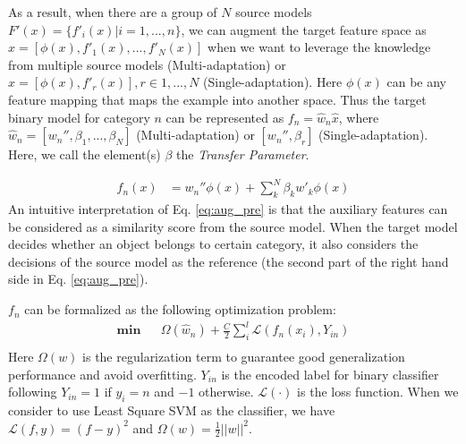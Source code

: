 As a result, when there are a group of $N$ source models $F'(x)=\{f'_i(x)|i=1,...,n\}$, we can augment the target feature space as  $\hat{x}=[\phi(x),f'_1(x),...,f'_N(x)]$ when we want to leverage the knowledge from multiple source models (Multi-adaptation) or $\hat{x}=[\phi(x),f'_r(x)], r\in 1,...,N$ (Single-adaptation). Here $\phi(x)$ can be any feature mapping that maps the example into another space. Thus the target binary model for category $n$ can be represented as $f_n=\hat{w}_n\hat{x}$, where $\hat{w}_n=[w_{n}'',\beta_1,...,\beta_N]$ (Multi-adaptation) or $[w_{n}'',\beta_r]$ (Single-adaptation). Here, we call the element(s) $\beta$ the \textit{Transfer Parameter}. 

\begin{equation}\label{eq:aug_pre}
\begin{aligned}
f_n(x)&=w_{n}''\phi(x)+\sum\limits_k^N{\beta _kw'_k\phi(x)}
\end{aligned}
\end{equation}
An intuitive interpretation of Eq. \eqref{eq:aug_pre} is that the auxiliary features can be considered as a similarity score from the source model. When the target model decides whether an object belongs to certain category, it also considers the decisions of the source model as the reference (the second part of the right hand side in Eq. \eqref{eq:aug_pre}).

$f_n$ can be formalized as the following optimization problem:
\begin{equation}\label{eq:svm_obj}
\begin{aligned}
\textbf{min} && \Omega(\hat{w}_n) + \frac{C}{2}\sum\limits_i^l {\mathcal{L}(f_n(x_i),Y_{in})} \\
\end{aligned}
\end{equation}
Here $\Omega({w})$ is the regularization term to guarantee good generalization performance and avoid overfitting. $Y_{in}$ is the encoded label for binary classifier following $Y_{in}=1$ if $y_i=n$ and $-1$ otherwise. $\mathcal{L}(\cdot)$ is the loss function. When we consider to use Least Square SVM as the classifier, we have $\mathcal{L}(f,y) = (f-y)^2$ and $\Omega({w}) = \frac{1}{2}||w||^2$. 

